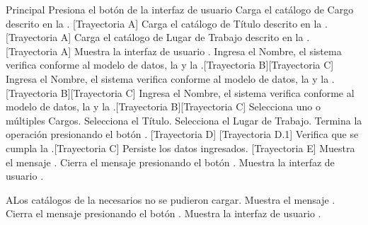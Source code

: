 \begin{UCtrayectoria}{Principal}
    \UCpaso[\UCactor] Presiona el botón \IUbutton{(+)} de la interfaz de usuario 
    \UCpaso Carga el catálogo de Cargo descrito en la . [Trayectoria A]
    \UCpaso Carga el catálogo de Título descrito en la . [Trayectoria A]
    \UCpaso Carga el catálogo de Lugar de Trabajo descrito en la . [Trayectoria A]
    \UCpaso Muestra la interfaz de usuario .
    \UCpaso[\UCactor] Ingresa el Nombre, el sistema verifica conforme al modelo de datos, la  y la .[Trayectoria B][Trayectoria C]
    \UCpaso[\UCactor] Ingresa el Nombre, el sistema verifica conforme al modelo de datos, la  y la .[Trayectoria B][Trayectoria C]
    \UCpaso[\UCactor] Ingresa el Nombre, el sistema verifica conforme al modelo de datos, la  y la .[Trayectoria B][Trayectoria C]
    \UCpaso[\UCactor] Selecciona uno o múltiples Cargos.
    \UCpaso[\UCactor] Selecciona el Título.
    \UCpaso[\UCactor] Selecciona el Lugar de Trabajo.
    \UCpaso[\UCactor] Termina la operación presionando el botón . [Trayectoria D] [Trayectoria D.1]
    \UCpaso Verifica que se cumpla la .[Trayectoria C]
    \UCpaso Persiste los datos ingresados. [Trayectoria E]
    \UCpaso Muestra el mensaje .
    \UCpaso[\UCactor] Cierra el mensaje presionando el botón .
    \UCpaso Muestra la interfaz de usuario .
\end{UCtrayectoria}
\begin{UCtrayectoriaA}{A}{Los catálogos de la  necesarios no se pudieron cargar.}
    \UCpaso Muestra el mensaje .
    \UCpaso[\UCactor] Cierra el mensaje presionando el botón .
    \UCpaso Muestra la interfaz de usuario .
\end{UCtrayectoriaA}

